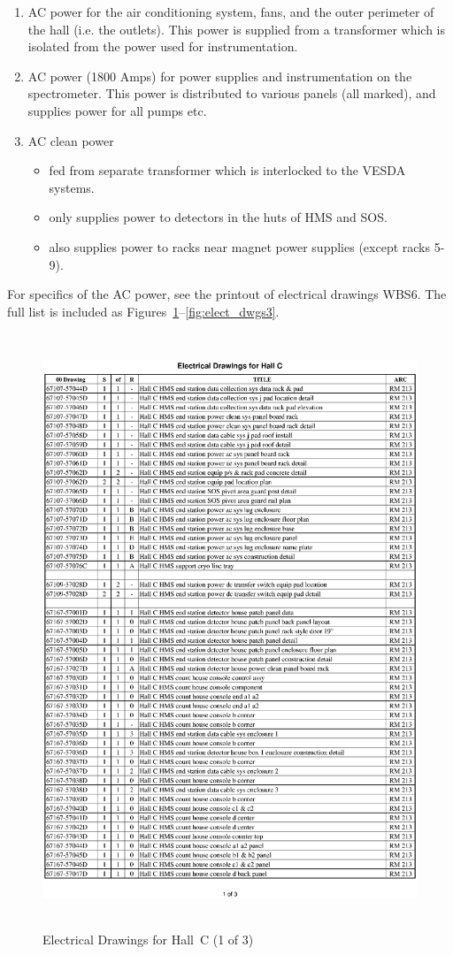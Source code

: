 \begin{enumerate}
\item{AC power for the air conditioning system, fans, and the
outer perimeter of the hall (i.e. the outlets). This power is
supplied from a transformer which is isolated from the power
used for instrumentation.}
\item{AC power (1800 Amps) for power supplies and instrumentation
on the spectrometer. This power is distributed to various panels
(all marked), and supplies power for all pumps etc.}
\item{AC clean power
\begin{itemize}
\item{fed from separate transformer which is interlocked to the
VESDA systems.}
\item{only supplies power to detectors in the huts of HMS and SOS.}
\item{also supplies power to racks near magnet power supplies (except
racks 5-9).}
\end{itemize}}
\end{enumerate}

For specifics of the AC power, see the printout of electrical drawings
WBS6. The full list is included as  Figures~\ref{fig:elect_dwgs1}--\ref{fig:elect_dwgs3}.
\clearpage
\begin{figure}
\begin{center}
\includegraphics[height=7in]{introduction/ele1p.ps}
\caption{Electrical Drawings for Hall~C (1 of 3)}
\label{fig:elect_dwgs1}
\end{center}
\end{figure}


